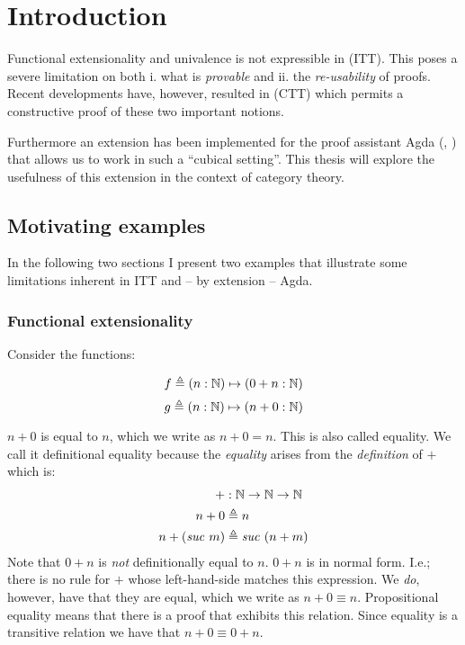 \chapter{Introduction}
Functional extensionality and univalence is not expressible in
 (ITT). This poses a severe limitation
on both i. what is \emph{provable} and ii. the \emph{re-usability} of proofs.
Recent developments have, however, resulted in  (CTT)
which permits a constructive proof of these two important notions.

Furthermore an extension has been implemented for the proof assistant Agda
(\cite{agda}, \cite{cubical-agda}) that allows us to work in such a ``cubical
setting''. This thesis will explore the usefulness of this extension in the
context of category theory.
%
\section{Motivating examples}
%
In the following two sections I present two examples that illustrate some
limitations inherent in ITT and -- by extension -- Agda.
%
\subsection{Functional extensionality}
Consider the functions:
%
\begin{multicols}{2}
  \noindent
  \begin{equation*}
    f \mathrel{\triangleq} (n \mathrel{:} \mathbb{N}) \mapsto (0 + n \mathrel{:} \mathbb{N})
  \end{equation*}
  \begin{equation*}
    g \mathrel{\triangleq} (n \mathrel{:} \mathbb{N}) \mapsto (n + 0 \mathrel{:} \mathbb{N})
  \end{equation*}
\end{multicols}
%
$n + 0$ is  equal to $n$, which we write as $n + 0 = n$.
This is also called  equality. We call it definitional
equality because the \emph{equality} arises from the \emph{definition} of $+$
which is:
%
\newcommand{\suc}[1]{\mathit{suc}\ #1}
\begin{align*}
  +           & \tp \bN \to \bN \to \bN      \\
  n + 0       & \defeq n                   \\
  n + (\suc{m}) & \defeq \suc{(n + m)}
\end{align*}
%
Note that $0 + n$ is \emph{not} definitionally equal to $n$. $0 + n$ is in
normal form. I.e.; there is no rule for $+$ whose left-hand-side matches this
expression. We \emph{do}, however, have that they are 
equal, which we write as $n + 0 \equiv n$. Propositional equality means that
there is a proof that exhibits this relation. Since equality is a transitive
relation we have that $n + 0 \equiv 0 + n$.

